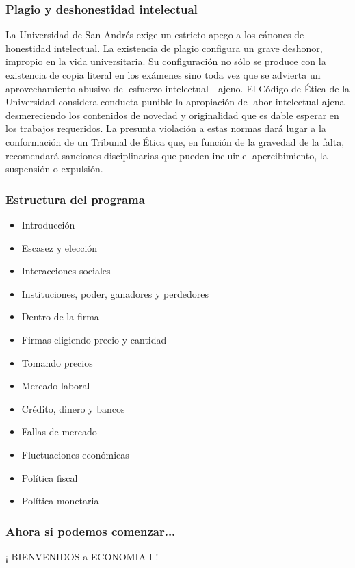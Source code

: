 \documentclass{beamer}
\begin{document}
\begin{frame}
\frametitle{Plagio y deshonestidad intelectual}
\small{
    La Universidad de San Andrés exige un estricto apego a los cánones de honestidad intelectual. La existencia de plagio configura un grave deshonor, impropio en la vida universitaria. Su configuración no sólo se produce con la existencia de copia literal en los exámenes sino toda vez que se advierta un aprovechamiento abusivo del esfuerzo intelectual  - ajeno. El Código de Ética de la Universidad considera conducta punible la apropiación de labor intelectual ajena desmereciendo los contenidos de novedad y originalidad que es dable esperar en los trabajos requeridos. La presunta violación a estas normas dará lugar a la conformación de un Tribunal de Ética que, en función de la gravedad de la falta, recomendará sanciones disciplinarias que pueden incluir el apercibimiento, la suspensión o expulsión.}
\end{frame}

\begin{frame}
\frametitle{Estructura del programa}
\begin{itemize}
    \item Introducción
    \item Escasez y elección
    \item Interacciones sociales
    \item Instituciones, poder, ganadores y perdedores
    \item Dentro de la firma
    \item Firmas eligiendo precio y cantidad
    \item Tomando precios
    \item Mercado laboral
    \item Crédito, dinero y bancos
    \item Fallas de mercado
    \item Fluctuaciones económicas
    \item Política fiscal
    \item Política monetaria
\end{itemize}
\end{frame}

\begin{frame}
    \frametitle{Ahora si podemos comenzar...}
    \centering
    \huge
    ¡ BIENVENIDOS a ECONOMIA I !
\end{frame}
\end{document}

